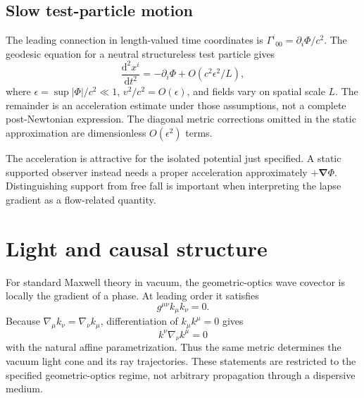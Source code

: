 \documentclass[11pt,oneside]{report}
\newcommand{\Ph}{\Phi}
\newcommand{\dd}{\mathrm d}
\theoremstyle{remark}
\numberwithin{definition}{chapter}
\numberwithin{proposition}{chapter}
\numberwithin{remark}{chapter}
\begin{document}
\subsection{Slow test-particle motion}
The leading connection in length-valued time coordinates is $\Gamma^i{}_{00}=\partial_i\Ph/c^2$. The geodesic equation for a neutral structureless test particle gives
\begin{equation}
\frac{\dd^2x^i}{\dd t^2}=-\partial_i\Ph+O(c^2\epsilon^2/L),
\label{relativistic_recovery:eq:newtonianlimit}
\end{equation}
where $\epsilon=\sup|\Ph|/c^2\ll1$, $v^2/c^2=O(\epsilon)$, and fields vary on spatial scale $L$. The remainder is an acceleration estimate under those assumptions, not a complete post-Newtonian expression. The diagonal metric corrections omitted in the static approximation are dimensionless $O(\epsilon^2)$ terms.

The acceleration is attractive for the isolated potential just specified. A static supported observer instead needs a proper acceleration approximately $+\boldsymbol\nabla\Ph$. Distinguishing support from free fall is important when interpreting the lapse gradient as a flow-related quantity.

\section{Light and causal structure}
For standard Maxwell theory in vacuum, the geometric-optics wave covector is locally the gradient of a phase. At leading order it satisfies
\begin{equation}
g^{\mu\nu}k_\mu k_\nu=0.
\label{relativistic_recovery:eq:null}
\end{equation}
Because $\nabla_\mu k_\nu=\nabla_\nu k_\mu$, differentiation of $k_\mu k^\mu=0$ gives
\begin{equation}
k^\nu\nabla_\nu k^\mu=0
\label{relativistic_recovery:eq:nullgeodesic}
\end{equation}
with the natural affine parametrization. Thus the same metric determines the vacuum light cone and its ray trajectories. These statements are restricted to the specified geometric-optics regime, not arbitrary propagation through a dispersive medium.
\end{document}
